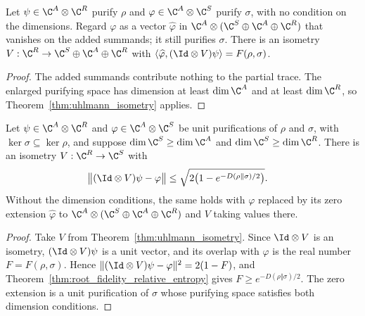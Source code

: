 \begin{theorem}
    \label{thm:uhlmann_isometry_padded}
    \leanok
    Let $\psi\in\C^{A}\otimes\C^{R}$ purify $\rho$ and
    $\varphi\in\C^{A}\otimes\C^{S}$ purify $\sigma$, with no condition on
    the dimensions. Regard $\varphi$ as a vector $\widehat\varphi$ in
    $\C^A\otimes(\C^S\oplus\C^A\oplus\C^R)$ that vanishes on the added
    summands; it still purifies $\sigma$. There is an isometry
    $V:\C^R\to\C^S\oplus\C^A\oplus\C^R$ with
    $\langle\widehat\varphi,(\Id\otimes V)\psi\rangle=F(\rho,\sigma)$.
\end{theorem}

\begin{proof}\leanok
    The added summands contribute nothing to the partial trace. The
    enlarged purifying space has dimension at least $\dim\C^A$ and at
    least $\dim\C^R$, so Theorem~\ref{thm:uhlmann_isometry} applies.
\end{proof}

\begin{theorem}
    \label{thm:purification_distance_relative_entropy}
    \leanok
    Let $\psi\in\C^A\otimes\C^R$ and $\varphi\in\C^A\otimes\C^S$ be unit
    purifications of $\rho$ and $\sigma$, with
    $\ker\sigma\subseteq\ker\rho$, and suppose
    $\dim\C^S\ge\dim\C^A$ and $\dim\C^S\ge\dim\C^R$. There is an isometry
    $V:\C^R\to\C^S$ with
    \begin{align}
        \bigl\lVert(\Id\otimes V)\psi-\varphi\bigr\rVert
         & \le\sqrt{2\bigl(1-e^{-D(\rho\Vert\sigma)/2}\bigr)}.
        \label{eq:purification_distance_relative_entropy}
    \end{align}
    Without the dimension conditions, the same holds with $\varphi$
    replaced by its zero extension $\widehat\varphi$ to
    $\C^A\otimes(\C^S\oplus\C^A\oplus\C^R)$ and $V$ taking values there.
\end{theorem}

\begin{proof}\leanok
    Take $V$ from Theorem~\ref{thm:uhlmann_isometry}. Since
    $\Id\otimes V$ is an isometry, $(\Id\otimes V)\psi$ is a unit vector,
    and its overlap with $\varphi$ is the real number $F=F(\rho,\sigma)$.
    Hence
    $\lVert(\Id\otimes V)\psi-\varphi\rVert^2=2(1-F)$, and
    Theorem~\ref{thm:root_fidelity_relative_entropy} gives
    $F\ge e^{-D(\rho\Vert\sigma)/2}$. The zero extension is a unit
    purification of $\sigma$ whose purifying space satisfies both
    dimension conditions.
\end{proof}

